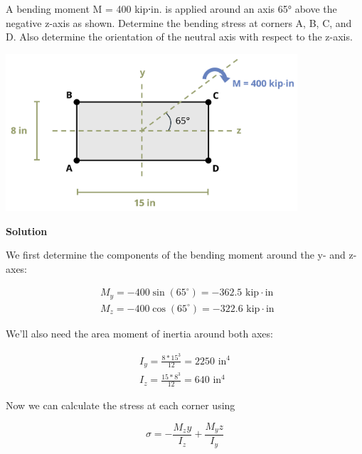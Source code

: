 \documentclass[
  letterpaper,
  DIV=11,
  numbers=noendperiod]{scrreprt}
\begin{document}
\begin{tcolorbox}[enhanced jigsaw, colback=white, colframe=quarto-callout-note-color-frame, leftrule=.75mm, opacitybacktitle=0.6, colbacktitle=quarto-callout-note-color!10!white, arc=.35mm, bottomrule=.15mm, breakable, title={Example 9.5: Unsymmetric Bending\,}, left=2mm, titlerule=0mm, toptitle=1mm, toprule=.15mm, opacityback=0, rightrule=.15mm, coltitle=black, bottomtitle=1mm]

A bending moment M = 400 kip⸱in. is applied around an axis 65° above the
negative z-axis as shown. Determine the bending stress at corners A, B,
C, and D. Also determine the orientation of the neutral axis with
respect to the z-axis.

\begin{center}
\includegraphics[width=4.27083in,height=\textheight]{images/CH9 PNGs/Example 9.5 part 1.png}
\end{center}

\textbf{Solution}

We first determine the components of the bending moment around the y-
and z-axes:

\[
\begin{aligned}
& M_y=-400 \sin \left(65^{\circ}\right)=-362.5 \text{ kip} \cdot \text {in } \\
& M_z=-400 \cos \left(65^{\circ}\right)=-322.6 \text{ kip} \cdot \text {in }
\end{aligned}
\]

We'll also need the area moment of inertia around both axes:

\[
\begin{gathered}
I_y=\frac{8 * 15^3}{12}=2250 \text{ in}^4 \\
I_z=\frac{15 * 8^3}{12}=640 \text{ in}^4
\end{gathered}
\]

Now we can calculate the stress at each corner using

\[
\sigma=-\frac{M_z y}{I_z}+\frac{M_y z}{I_y}
\]


\end{tcolorbox}
\end{document}
